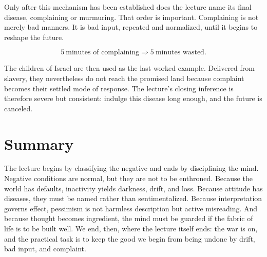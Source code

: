 Only after this mechanism has been established does the lecture name its final disease, complaining or murmuring. That order is important. Complaining is not merely bad manners. It is bad input, repeated and normalized, until it begins to reshape the future.

\begin{equation}
5\ \text{minutes of complaining} \Rightarrow 5\ \text{minutes wasted}.
\end{equation}

The children of Israel are then used as the last worked example. Delivered from slavery, they nevertheless do not reach the promised land because complaint becomes their settled mode of response. The lecture's closing inference is therefore severe but consistent: indulge this disease long enough, and the future is canceled.

\section{Summary}

The lecture begins by classifying the negative and ends by disciplining the mind. Negative conditions are normal, but they are not to be enthroned. Because the world has defaults, inactivity yields darkness, drift, and loss. Because attitude has diseases, they must be named rather than sentimentalized. Because interpretation governs effect, pessimism is not harmless description but active misreading. And because thought becomes ingredient, the mind must be guarded if the fabric of life is to be built well. We end, then, where the lecture itself ends: the war is on, and the practical task is to keep the good we begin from being undone by drift, bad input, and complaint.